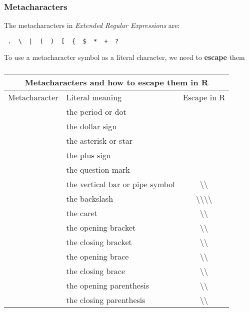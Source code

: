 \documentclass[12pt]{beamer}\usepackage[]{graphicx}\usepackage[]{color}
\begin{document}

\begin{frame}[fragile]
\frametitle{Metacharacters}

The metacharacters in \textit{Extended Regular Expressions} are:
\begin{verbatim}
 .  \  |  (  )  [  {  $  *  +  ?
\end{verbatim}

\bigskip
To use a metacharacter symbol as a literal character, we need to \textbf{escape} them

\end{frame}


\begin{frame}[fragile]
\frametitle{}

\begin{center}
 \begin{tabular}{c l c}
  \multicolumn{3}{c}{\textbf{Metacharacters and how to escape them in R}} \\
 \hline
  Metacharacter & Literal meaning & Escape in R \\
  \hline
  \code{.} & the period or dot & \code{\textbackslash{\textbackslash{.}}} \\
  \code{\$} & the dollar sign & \code{\textbackslash{\textbackslash{\$}}} \\  
  \code{*} & the asterisk or star & \code{\textbackslash{\textbackslash{*}}} \\
  \code{+} & the plus sign & \code{\textbackslash{\textbackslash{+}}} \\
  \code{?} & the question mark & \code{\textbackslash{\textbackslash{?}}} \\
  \code{|} & the vertical bar or pipe symbol & \textbackslash{\textbackslash{\code{|}}} \\
  \code{\textbackslash{}} & the backslash & \textbackslash{\textbackslash{\textbackslash{\textbackslash{}}}} \\
  \code{\^} & the caret & \textbackslash{\textbackslash{\code{\^}}} \\
  \code{[} & the opening bracket & \textbackslash{\textbackslash{\code{[}}} \\
  \code{]} & the closing bracket & \textbackslash{\textbackslash{\code{]}}} \\
  \code{\{} & the opening brace & \textbackslash{\textbackslash{\code{\{}}} \\
  \code{\}} & the closing brace & \textbackslash{\textbackslash{\code{\}}}} \\
  \code{(} & the opening parenthesis & \textbackslash{\textbackslash{\code{(}}} \\
  \code{)} & the closing parenthesis & \textbackslash{\textbackslash{\code{)}}} \\
  \hline
 \end{tabular}
\end{center}

\end{frame}
\end{document}
